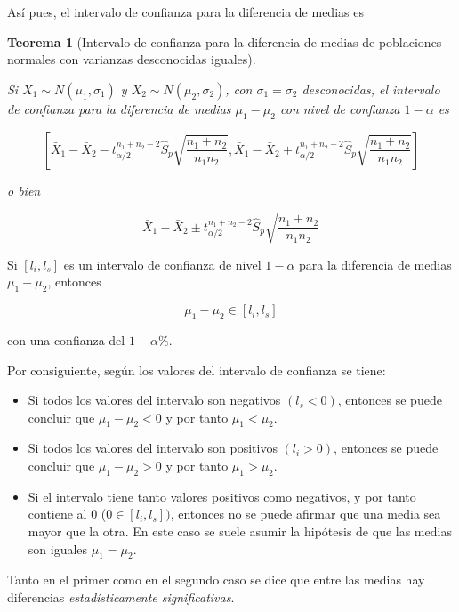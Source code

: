 \documentclass[
  a4paper,
]{scrreport}
\providecommand{\tightlist}{%
  \setlength{\itemsep}{0pt}\setlength{\parskip}{0pt}}\usepackage{longtable,booktabs,array}
\theoremstyle{plain}
\newtheorem{theorem}{Teorema}[chapter]
\theoremstyle{definition}
\theoremstyle{definition}
\theoremstyle{remark}
\begin{document}
Así pues, el intervalo de confianza para la diferencia de medias es

\begin{theorem}[Intervalo de confianza para la diferencia de medias de
poblaciones normales con varianzas desconocidas
iguales]\protect\hypertarget{thm-intervalo-confianza-diferencia-medias-normales-varianzas-desconocidas-iguales}{}\label{thm-intervalo-confianza-diferencia-medias-normales-varianzas-desconocidas-iguales}

Si \(X_1\sim N(\mu_1,\sigma_1)\) y \(X_2\sim N(\mu_2,\sigma_2)\), con
\(\sigma_1 = \sigma_2\) desconocidas, el \emph{intervalo de confianza
para la diferencia de medias} \(\mu_1-\mu_2\) con nivel de confianza
\(1-\alpha\) es

\[
\left[\bar{X}_1-\bar{X}_2-t^{n_1+n_2-2}_{\alpha/2}\hat{S}_p\sqrt{\frac{n_1+n_2}{n_1n_2}},\bar{X}_1-\bar{X}_2+t^{n_1+n_2-2}_{\alpha/2}\hat{S}_p\sqrt{\frac{n_1+n_2}{n_1n_2}}\right]
\]

o bien

\[
\bar{X}_1-\bar{X}_2\pm t^{n_1+n_2-2}_{\alpha/2}\hat{S}_p\sqrt{\frac{n_1+n_2}{n_1n_2}}
\]

\end{theorem}

Si \([l_i,l_s]\) es un intervalo de confianza de nivel \(1-\alpha\) para
la diferencia de medias \(\mu_1-\mu_2\), entonces

\[
\mu_1-\mu_2 \in [l_i,l_s]
\]

con una confianza del \(1-\alpha\%\).

Por consiguiente, según los valores del intervalo de confianza se tiene:

\begin{itemize}
\tightlist
\item
  Si todos los valores del intervalo son negativos \((l_s<0)\), entonces
  se puede concluir que \(\mu_1-\mu_2<0\) y por tanto \(\mu_1<\mu_2\).
\item
  Si todos los valores del intervalo son positivos \((l_i>0)\), entonces
  se puede concluir que \(\mu_1-\mu_2>0\) y por tanto \(\mu_1>\mu_2\).
\item
  Si el intervalo tiene tanto valores positivos como negativos, y por
  tanto contiene al 0 (\(0\in [l_i,l_s])\), entonces no se puede afirmar
  que una media sea mayor que la otra. En este caso se suele asumir la
  hipótesis de que las medias son iguales \(\mu_1=\mu_2\).
\end{itemize}

Tanto en el primer como en el segundo caso se dice que entre las medias
hay diferencias \emph{estadísticamente significativas}.
\end{document}
